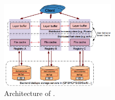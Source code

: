 \begin{figure}[t]
	\centering
			\centering
			\includegraphics[width=0.5\textwidth]{graphs/sys-architecture.png}
			\caption{Architecture of \sysname.}
		\label{fig:sys-overview}
\end{figure}